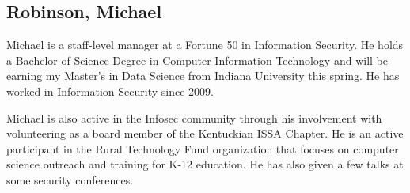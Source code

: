 \subsection{Robinson, Michael}

Michael is a staff-level manager at a Fortune 50 in Information Security. He holds a Bachelor of Science Degree in Computer Information Technology and will be earning my Master’s in Data Science from Indiana University this spring. He has worked in Information Security since 2009. 

Michael is also active in the Infosec community through his involvement with volunteering as a board member of the Kentuckian ISSA Chapter. He is an active participant in the Rural Technology Fund organization that focuses on computer science outreach and training for K-12 education. He has also given a few talks at some security conferences.
